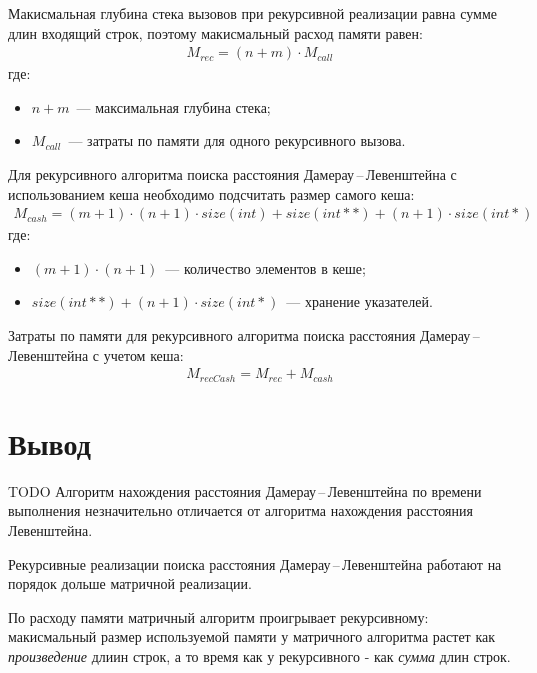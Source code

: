 Макисмальная глубина стека вызовов при рекурсивной реализации равна сумме длин входящий строк, поэтому макисмальный расход памяти равен:
\begin{equation}
	\label{}
	\begin{aligned}
		M_{rec} = (n + m) \cdot M_{call}
	\end{aligned}
\end{equation}
где: 
\begin{itemize}
    \item $n + m$~--- максимальная глубина стека;
	\item $M_{call}$~--- затраты по памяти для одного рекурсивного вызова.
\end{itemize}

Для рекурсивного алгоритма поиска расстояния Дамерау\,--\,Левенштейна с использованием кеша необходимо подсчитать размер самого кеша:
\begin{equation}
	\label{}
	\begin{aligned}
		M_{cash} = (m + 1) \cdot (n + 1) \cdot size(int) + size(int **) + (n + 1) \cdot size(int *)
	\end{aligned}
\end{equation}
где: 
\begin{itemize}
    \item $(m + 1) \cdot (n + 1)$~--- количество элементов в кеше;
	\item $size(int **) + (n + 1) \cdot size(int *)$~--- хранение указателей.
\end{itemize}

Затраты по памяти для рекурсивного алгоритма поиска расстояния Дамерау\,--\,Левенштейна с учетом кеша: 
\begin{equation}
	\label{}
	\begin{aligned}
		M_{recCash} = M_{rec} + M_{cash}
	\end{aligned}
\end{equation}

\section{Вывод}
TODO
Алгоритм нахождения расстояния Дамерау\,--\,Левенштейна по времени выполнения незначительно отличается от алгоритма нахождения расстояния Левенштейна.

Рекурсивные реализации поиска расстояния Дамерау\,--\,Левенштейна работают на порядок дольше матричной реализации.

По расходу памяти матричный алгоритм проигрывает рекурсивному: макисмальный размер используемой памяти у матричного алгоритма растет как \textit{произведение} длиин строк, а то время как у рекурсивного - как \textit{сумма} длин строк.